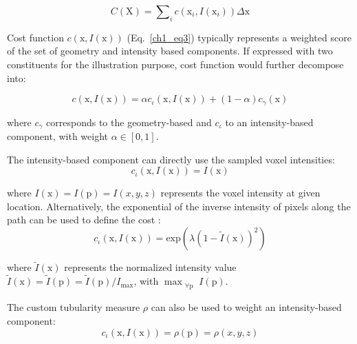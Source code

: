 
\begin{equation}
C(\mathrm{X}) = \sum\nolimits_{i} c(\mathrm{x}_i, I(\mathrm{x}_i)) \Delta\mathrm{x} 
\label{ch1_eq3}
\end{equation}

Cost function $ c( \mathrm{x}, I(\mathrm{x}) ) $ (Eq.~\ref{ch1_eq3}) typically represents a weighted score of the set of geometry and intensity based components. If expressed with two constituents for the illustration purpose, cost function would further decompose into:

\begin{equation}
c(\mathrm{x}, I(\mathrm{x})) = \alpha c_{\iota}(\mathrm{x}, I(\mathrm{x})) + (1-\alpha) c_{\gamma}(\mathrm{x}) 
\label{ch1_eq4}
\end{equation}

where $c_{\gamma}$ corresponds to the geometry-based and $c_{\iota}$ to an intensity-based component, with weight $ \alpha \in \left[ 0, 1 \right] $. 

The intensity-based component can directly use the sampled voxel intensities:
\begin{equation}
c_{\iota}( \mathrm{x}, I(\mathrm{x}) ) = I(\mathrm{x})
\end{equation}

where $I(\mathrm{x}) = I(\mathrm{p}) = I(x, y, z)$ represents the voxel intensity at given location. Alternatively, the exponential of the inverse intensity of pixels along the path can be used to define the cost \cite{peng2010automatic}:
\begin{equation}
c_{\iota}( \mathrm{x}, I(\mathrm{x}) ) = \text{exp} \left(  \lambda  (1 - \tilde{I}(\mathrm{x}))^2 \right)
\end{equation}

where $\tilde{I}(\mathrm{x})$ represents the normalized intensity value $ \tilde{I}(\mathrm{x}) = \tilde{I}(\mathrm{p}) = \tilde{I}(\mathrm{p}) / I_{\text{max}}$, with $\max_{\substack{\forall \mathrm{p}}} I(\mathrm{p})$.

The custom tubularity measure $\rho$ can also be used to weight an intensity-based component:
\begin{equation}
c_{\iota}( \mathrm{x}, I(\mathrm{x}) ) = \rho(\mathrm{p}) = \rho(x, y, z)
\end{equation}

